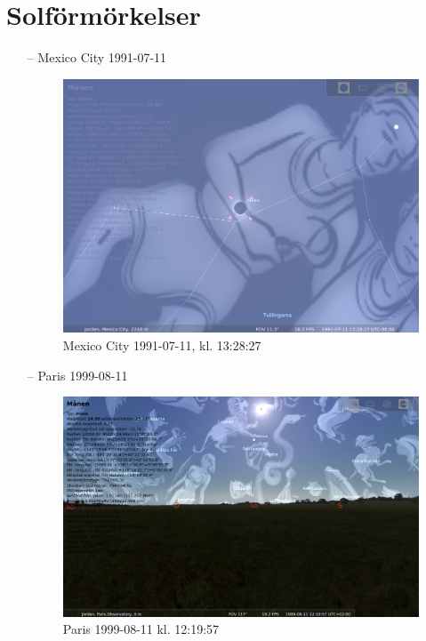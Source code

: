 \documentclass[./exercises.tex]{subfiles}
\begin{document}
\section{Solförmörkelser}

\begin{itemize}
    \item[--] Mexico City 1991-07-11
\begin{figure}[H]
\centering
  \includegraphics[scale=0.34]{stellarium-032.png}
  \caption{Mexico City 1991-07-11, kl. 13:28:27}
  \label{fig4}
\end{figure}


\item[--] Paris 1999-08-11
\begin{figure}[H]
\centering
  \includegraphics[scale=0.3]{stellarium-033.png}
  \caption{Paris 1999-08-11 kl. 12:19:57 }
  \label{fig4}
\end{figure}

\end{itemize}
\newpage
\end{document}
